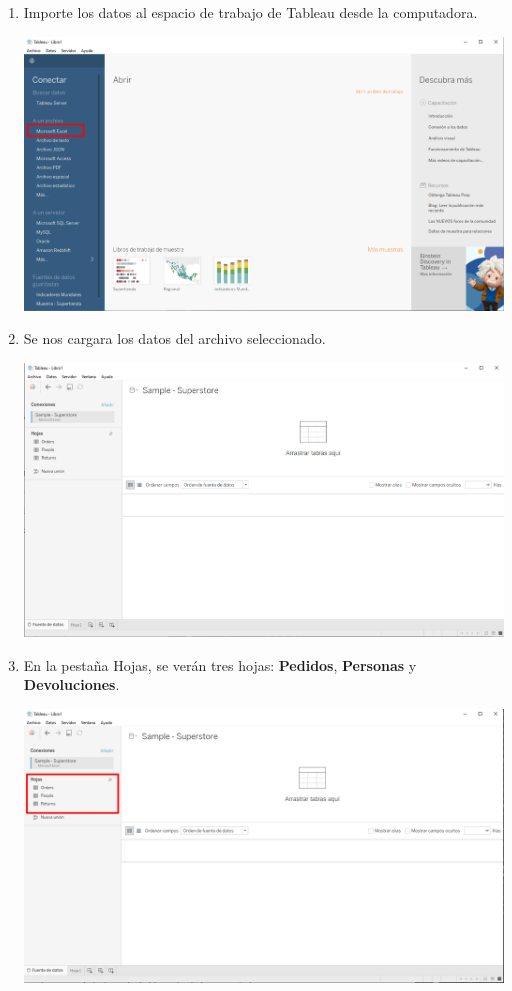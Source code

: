 \documentclass[12pt,letterpaper]{article}
\begin{document}
    \begin{enumerate}
        \item Importe los datos al espacio de trabajo de Tableau desde la computadora.
        \begin{center}
            \includegraphics[width=15cm]{./img/img4.png}
        \end{center}
        \item Se nos cargara los datos del archivo seleccionado.
        \begin{center}
            \includegraphics[width=15cm]{./img/img4.1.png}
        \end{center}
        \item En la pestaña Hojas, se verán tres hojas: \textbf{Pedidos}, \textbf{Personas} y \textbf{Devoluciones}.
        \begin{center}
            \includegraphics[width=15cm]{./img/img5.png}

\end{center}
\end{enumerate}
\end{document}
